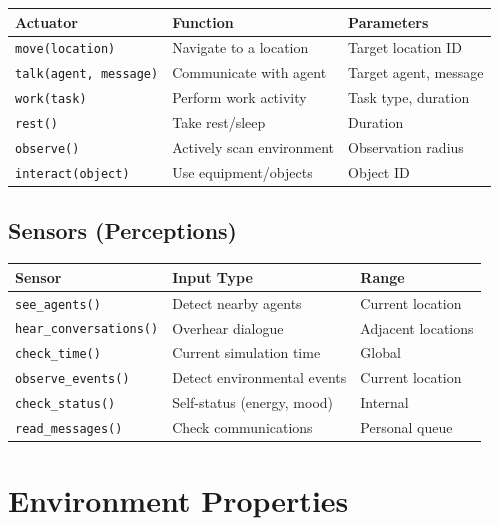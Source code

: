 \documentclass[12pt,a4paper]{article}
\begin{document}
\begin{table}[H]
\centering
\small
\begin{tabular}{|l|l|l|}
\hline
\textbf{Actuator} & \textbf{Function} & \textbf{Parameters} \\
\hline
\texttt{move(location)} & Navigate to a location & Target location ID \\
\texttt{talk(agent, message)} & Communicate with agent & Target agent, message \\
\texttt{work(task)} & Perform work activity & Task type, duration \\
\texttt{rest()} & Take rest/sleep & Duration \\
\texttt{observe()} & Actively scan environment & Observation radius \\
\texttt{interact(object)} & Use equipment/objects & Object ID \\
\hline
\end{tabular}
\end{table}

\subsection{Sensors (Perceptions)}

\begin{table}[H]
\centering
\small
\begin{tabular}{|l|l|l|}
\hline
\textbf{Sensor} & \textbf{Input Type} & \textbf{Range} \\
\hline
\texttt{see\_agents()} & Detect nearby agents & Current location \\
\texttt{hear\_conversations()} & Overhear dialogue & Adjacent locations \\
\texttt{check\_time()} & Current simulation time & Global \\
\texttt{observe\_events()} & Detect environmental events & Current location \\
\texttt{check\_status()} & Self-status (energy, mood) & Internal \\
\texttt{read\_messages()} & Check communications & Personal queue \\
\hline
\end{tabular}
\end{table}


\section{Environment Properties}
\end{document}
